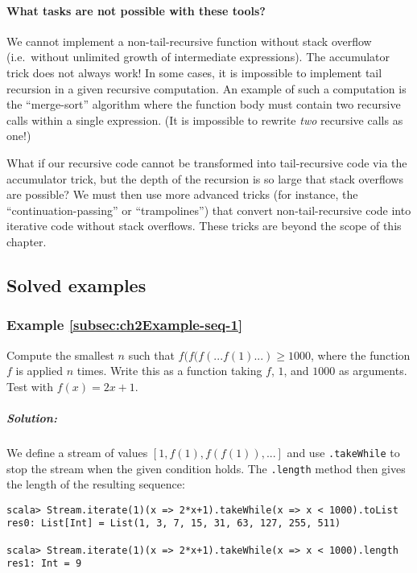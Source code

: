 \paragraph*{What tasks are not possible with these tools?}

We cannot implement a non-tail-recursive function without stack overflow
(i.e.~without unlimited growth of intermediate expressions). The
accumulator trick does not always work! In some cases, it is impossible
to implement tail recursion in a given recursive computation. An example
of such a computation is the ``merge-sort'' algorithm where the
function body must contain two recursive calls within a single expression.
(It is impossible to rewrite \emph{two} recursive calls as one!) 

What if our recursive code cannot be transformed into tail-recursive
code via the accumulator trick, but the depth of the recursion is
so large that stack overflows are possible? We must then use more
advanced tricks (for instance, the ``continuation-passing''
or ``trampolines'') that convert non-tail-recursive
code into iterative code without stack overflows. These tricks are
beyond the scope of this chapter.

\subsection{Solved examples}

\subsubsection{Example \label{subsec:ch2Example-seq-1}\ref{subsec:ch2Example-seq-1}}

Compute the smallest $n$ such that $f(f(f(...f(1)...)\geq1000$,
where the function $f$ is applied $n$ times. Write this as a function
taking $f$, $1$, and $1000$ as arguments. Test with $f(x)=2x+1$.

\subparagraph{Solution:}

We define a stream of values $\left[1,f(1),f(f(1)),...\right]$ and
use \lstinline!.takeWhile!
to stop the stream when the given condition holds. The \lstinline!.length!
method then gives the length of the resulting sequence: 
\begin{lstlisting}
scala> Stream.iterate(1)(x => 2*x+1).takeWhile(x => x < 1000).toList
res0: List[Int] = List(1, 3, 7, 15, 31, 63, 127, 255, 511)

scala> Stream.iterate(1)(x => 2*x+1).takeWhile(x => x < 1000).length
res1: Int = 9
\end{lstlisting}

